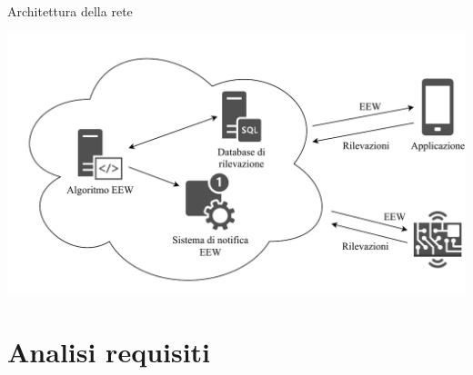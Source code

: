 \documentclass[compress]{beamer}
\begin{document}
\begin{frame}[c]{Architettura della rete}
\begin{center}
\includegraphics[width=\linewidth]{assets/01/rete.pdf}
\end{center}
\end{frame}

\section{Analisi requisiti}
\end{document}
